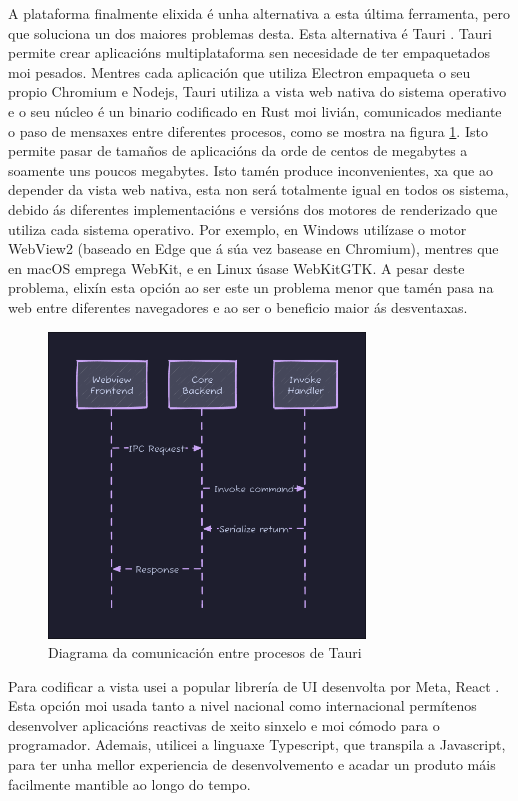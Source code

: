 A plataforma finalmente elixida é unha alternativa a esta última ferramenta, pero que soluciona un dos maiores problemas desta. Esta alternativa é Tauri \cite{Tauri}.
Tauri permite crear aplicacións multiplataforma sen necesidade de ter empaquetados moi pesados. Mentres cada aplicación que utiliza Electron empaqueta o seu propio Chromium e Nodejs, Tauri utiliza a vista web nativa do sistema operativo e o seu núcleo é un binario codificado en Rust \cite{Rust} moi livián, comunicados mediante o paso de mensaxes entre diferentes procesos, como se mostra na figura \ref{fig:TauriIPC}. Isto permite pasar de tamaños de aplicacións da orde de centos de megabytes a soamente uns poucos megabytes. Isto tamén produce inconvenientes, xa que ao depender da vista web nativa, esta non será totalmente igual en todos os sistema, debido ás diferentes implementacións e versións dos motores de renderizado que utiliza cada sistema operativo. Por exemplo, en Windows utilízase o motor WebView2 (baseado en Edge que á súa vez basease en Chromium), mentres que en macOS emprega WebKit, e en Linux úsase WebKitGTK. A pesar deste problema, elixín esta opción ao ser este un problema menor que tamén pasa na web entre diferentes navegadores e ao ser o beneficio maior ás desventaxas. 

\begin{figure}[hp!]
  \centering
  \includegraphics[width=0.75\textwidth]{imaxes/TauriIPC.png}
  \caption{Diagrama da comunicación entre procesos de Tauri}
  \label{fig:TauriIPC}
\end{figure}

Para codificar a vista usei a popular librería de UI desenvolta por Meta, React \cite{React}. Esta opción moi usada tanto a nivel nacional como internacional permítenos desenvolver aplicacións reactivas de xeito sinxelo e moi cómodo para o programador. Ademais, utilicei a linguaxe Typescript, que transpila a Javascript, para ter unha mellor experiencia de desenvolvemento e acadar un produto máis facilmente mantible ao longo do tempo.

